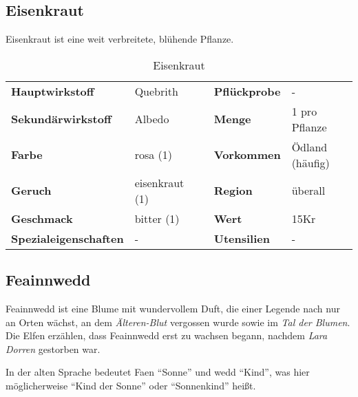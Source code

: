 \subsection{Eisenkraut}
Eisenkraut ist eine weit verbreitete, blühende Pflanze. 

\begin{table}[h] 
\begin{center} 
\begin{tabular}{|l|l|p{1cm}|l|l|} 
  	\cline{1-2} \cline{4-5} 
  	\textbf{Hauptwirkstoff} & Quebrith && \textbf{Pflückprobe} & - \\ \cline{1-2} \cline{4-5} 
  	\textbf{Sekundärwirkstoff} & Albedo && \textbf{Menge} & 1 pro Pflanze \\ \cline{1-2} \cline{4-5} 
  	\textbf{Farbe} & rosa (1) && \textbf{Vorkommen} & Ödland (häufig) \\ \cline{1-2} \cline{4-5} 
  	\textbf{Geruch} & eisenkraut (1) && \textbf{Region} & überall \\ \cline{1-2} \cline{4-5} 
  	\textbf{Geschmack} & bitter (1) && \textbf{Wert} & 15Kr \\ \cline{1-2} \cline{4-5} 
  	\textbf{Spezialeigenschaften} & - && \textbf{Utensilien} & - \\ \cline{1-2} \cline{4-5} 
\end{tabular} 
\end{center} 
\caption{Eisenkraut} 
\label{tab:eisenkraut} 
\end{table}


\subsection{Feainnwedd}
Feainnwedd ist eine Blume mit wundervollem Duft, die einer Legende nach nur an Orten wächst, an dem \textit{Älteren-Blut} vergossen wurde sowie im \textit{Tal der Blumen}. Die Elfen erzählen, dass Feainnwedd erst zu wachsen begann, nachdem \textit{Lara Dorren} gestorben war.

In der alten Sprache bedeutet Faen "`Sonne"' und wedd "`Kind"', was hier möglicherweise "`Kind der Sonne"' oder "`Sonnenkind"' heißt. 

